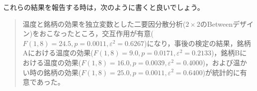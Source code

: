 \documentclass{ltjbook}
\begin{document}
これらの結果を報告する時は，次のように書くと良いでしょう。
\begin{quote}
	温度と銘柄の効果を独立変数とした二要因分散分析($2 \times 2$のBetweenデザイン)をおこなったところ，交互作用が有意($F(1,8)=24.5,p=0.0011,\varepsilon^2=0.6267$)になり，事後の検定の結果，銘柄Aにおける温度の効果($F(1,8)=9.0,p=0.0171,\varepsilon^2=0.2133$)，銘柄Bにおける温度の効果($F(1,8)=16.0,p=0.0039,\varepsilon^2=0.4000$)，および温かい時の銘柄の効果($F(1,8)=25.0,p=0.0011,\varepsilon^2=0.6400$)が統計的に有意であった。
\end{quote}



 


\end{document}
